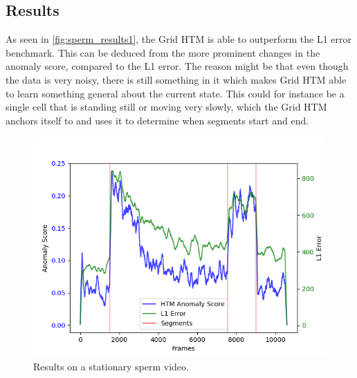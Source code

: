 \subsection{Results}
As seen in \autoref{fig:sperm_results1}, the Grid HTM is able to outperform the L1 error benchmark. This can be deduced from the more prominent changes in the anomaly score, compared to the L1 error. The reason might be that even though the data is very noisy, there is still something in it which makes Grid HTM able to learn something general about the current state. This could for instance be a single cell that is standing still or moving very slowly, which the Grid HTM anchors itself to and uses it to determine when segments start and end.
\begin{figure}[H]
    \centering
    \includegraphics[width=\textwidth]{resources/experiments/sperm/sperm_result1.png}
    \caption[Stationary Video Results]{Results on a stationary sperm video.}
    \label{fig:sperm_results1}
\end{figure}

